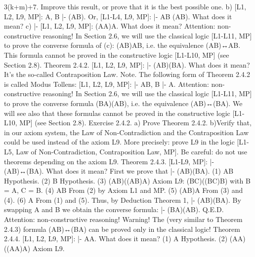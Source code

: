 3(k+m)+7. Improve this result, or prove that it is the best possible one.
b) [L1, L2, L9, MP]: A, \neg B |- \neg (A\IMPLIES B). Or, [L1-L4, L9, MP]: |- A\AND \neg B \IMPLIES  \neg (A\IMPLIES B). What does it mean?
c) |- [L1, L2, L9, MP]: (A\IMPLIES \neg A)\IMPLIES \neg A. What does it mean?
Attention: non-constructive reasoning! In Section 2.6, we will use the classical logic [L1-L11, MP] to
prove the converse formula of (c): \neg (A\IMPLIES B)\IMPLIES A\AND \neg B, i.e. the equivalence \neg (A\IMPLIES B)↔A\AND \neg B. This
formula cannot be proved in the constructive logic [L1-L10, MP] (see Section 2.8).
Theorem 2.4.2. [L1, L2, L9, MP]: |- (A\IMPLIES B)\IMPLIES (\neg B\IMPLIES \neg A). What does it mean? It's the so-called
Contraposition Law.
Note. The following form of Theorem 2.4.2 is called Modus Tollens:
[L1, L2, L9, MP]: |- A\IMPLIES B, \neg B |- \neg A.
Attention: non-constructive reasoning! In Section 2.6, we will use the classical logic [L1-L11, MP] to
prove the converse formula (\neg B\IMPLIES \neg A)\IMPLIES (A\IMPLIES B), i.e. the equivalence (A\IMPLIES B)↔(\neg B\IMPLIES \neg A). We will see
also that these formulas cannot be proved in the constructive logic [L1-L10, MP] (see Section 2.8).
Exercise 2.4.2. a) Prove Theorem 2.4.2.
b)Verify that, in our axiom system, the Law of Non-Contradiction and the Contraposition Law could be
used instead of the axiom L9. More precisely: prove L9 in the logic [L1-L5, Law of Non-Contradiction,
Contraposition Law, MP]. Be careful: do not use theorems depending on the axiom L9.
Theorem 2.4.3. [L1-L9, MP]: |- (A\IMPLIES \neg B)↔(B\IMPLIES \neg A). What does it mean?
First we prove that |- (A\IMPLIES \neg B)\IMPLIES (B\IMPLIES \neg A).
(1) A\IMPLIES \neg B Hypothesis.
(2) B Hypothesis.
(3) (A\IMPLIES B)\IMPLIES ((A\IMPLIES \neg B)\IMPLIES \neg A) Axiom L9: (B\IMPLIES C)\IMPLIES ((B\IMPLIES \neg C)\IMPLIES \neg B) with B
                                         = A, C = B.
(4) A\IMPLIES B From (2) by Axiom L1 and MP.
(5) (A\IMPLIES \neg B)\IMPLIES \neg A From (3) and (4).
(6) \neg A
From (1) and (5).
Thus, by Deduction Theorem 1, |- (A\IMPLIES \neg B)\IMPLIES (B\IMPLIES \neg A). By swapping A and B we obtain the converse
formula: |- (B\IMPLIES \neg A)\IMPLIES (A\IMPLIES \neg B). Q.E.D.
Attention: non-constructive reasoning! Warning! The (very similar to Theorem 2.4.3) formula
(\neg A\IMPLIES B)↔(\neg B\IMPLIES A) can be proved only in the classical logic!
Theorem 2.4.4. [L1, L2, L9, MP]: |- A\IMPLIES \neg \neg A. What does it mean?
(1) A Hypothesis.
(2) (\neg A\IMPLIES A)\IMPLIES ((\neg A\IMPLIES \neg A)\IMPLIES \neg \neg A) Axiom L9.
